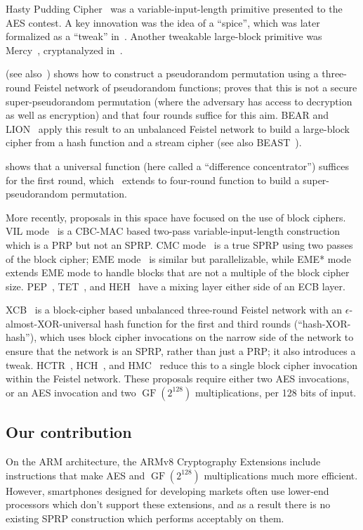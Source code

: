 \documentclass[letterpaper,luatex,11pt]{article}
\DeclareMathOperator{\GF}{GF}
\begin{document}
Hasty Pudding Cipher~\cite{hpc} was a variable-input-length primitive presented to the AES contest.
A key innovation
was the idea of a ``spice'', which was later formalized as a ``tweak'' in~\cite{tweakable}.
Another tweakable large-block primitive was Mercy~\cite{mercy},
cryptanalyzed in~\cite{mercycryptanalysis}.

\cite{luby-rackoff} (see also~\cite{maurer-luby-rackoff,ppdes})
shows how to construct a pseudorandom permutation using a three-round Feistel
network of pseudorandom functions;
proves that this is not a secure super-pseudorandom permutation (where the adversary
has access to decryption as well as encryption) and that four rounds suffice for this aim.
BEAR and LION~\cite{bearlion} apply this result to an unbalanced Feistel network to build a
large-block cipher from a hash function and a stream cipher (see also BEAST~\cite{beast}).

\cite{fasterlr} shows that a universal function (here called a ``difference concentrator'')
suffices for the first round, which~\cite{NaorReingold} extends to four-round function
to build a super-pseudorandom permutation.

More recently, proposals in this space have focused on the use of
block ciphers. VIL mode~\cite{brvil} is a CBC-MAC based two-pass variable-input-length construction which
is a PRP but not an SPRP. CMC mode~\cite{cmc} is a true SPRP using two passes of the block cipher;
EME mode~\cite{eme} is similar but parallelizable, while
EME* mode~\cite{emestar} extends EME mode to handle blocks that are not a multiple of the block
cipher size. PEP~\cite{pep}, TET~\cite{tet}, and HEH~\cite{heh} have a mixing layer either side of
an ECB layer.

XCB~\cite{xcb} is a block-cipher based unbalanced three-round Feistel network with an
$\epsilon$-almost-XOR-universal hash function for the first and third rounds
(``hash-XOR-hash''),
which uses block
cipher invocations on the narrow side of the network to ensure that the network is an SPRP, rather
than just a PRP; it also introduces a tweak.
HCTR~\cite{hctr,hctr2}, HCH~\cite{hch}, and HMC~\cite{hmc} reduce this to a single
block cipher invocation within the Feistel network.
These proposals require
either two AES invocations, or an AES invocation and two $\GF(2^{128})$ multiplications,
per 128 bits of input.

\subsection{Our contribution}
On the ARM architecture, the ARMv8 Cryptography Extensions include instructions that make
AES and $\GF(2^{128})$ multiplications much more efficient. However,
smartphones designed for developing markets
often use lower-end processors which
don't support these extensions, and as a result there is no existing SPRP construction which performs
acceptably on them.
\end{document}

